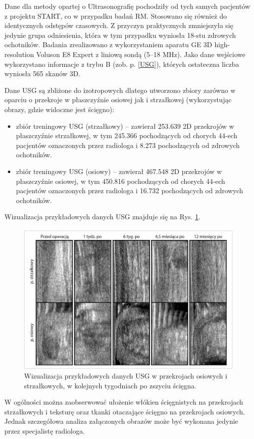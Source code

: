 Dane dla metody opartej o Ultrasonografię pochodziły od tych samych pacjentów z projektu START, co w przypadku badań RM. Stosowano się również do identycznych odstępów czasowych. Z przyczyn praktycznych zmniejszyła się jedynie grupa odniesienia, która w tym przypadku wyniosła 18-stu zdrowych ochotników. Badania zrealizowano z wykorzystaniem aparatu GE 3D high-resolution Voluson E8 Expert z liniową sondą (5--18 MHz). Jako dane wejściowe wykorzystano informacje z trybu B (zob. p. \ref{USG}), których ostateczna liczba wyniosła 565 skanów 3D. 

Dane USG są zbliżone do izotropowych dlatego utworzono zbiory zarówno \linebreak w oparciu o przekroje w płaszczyźnie osiowej jak i strzałkowej (wykorzystując obrazy, gdzie widoczne jest ścięgno):
\begin{itemize}[noitemsep,nolistsep]
	\item zbiór treningowy USG (strzałkowy) -- zawierał 253.639 2D przekrojów w płaszczyźnie strzałkowej, w tym 245.366 pochodzących od chorych 44-ech pacjentów oznaczonych przez radiologa i 8.273 pochodzących od zdrowych ochotników.
	\item zbiór treningowy USG (osiowy) -- zawierał 467.548 2D przekrojów w płaszczyźnie osiowej, w tym 450.816 pochodzących od chorych 44-ech pacjentów oznaczonych przez radiologa i 16.732 pochodzących od zdrowych ochotników. 
\end{itemize}

Wizualizacja przykładowych danych USG znajduje się na Rys. \ref{fig:US_sample}.
\begin{figure}[h!]
	\includegraphics[width=\textwidth]{figures/Data_US_sample.jpg}
	\caption{Wizualizacja przykładowych danych USG w przekrojach osiowych i strzałkowych, w kolejnych tygodniach po zszyciu ścięgna.}
	\label{fig:US_sample}
\end{figure}
W ogólności można zaobserwować ułożenie włókien ścięgnistych na przekrojach strzałkowych \linebreak i teksturę oraz tkanki otaczające ścięgno na przekrojach osiowych. Jednak szczegółowa analiza załączonych obrazów może być wykonana jedynie przez specjalistę radiologa. 

